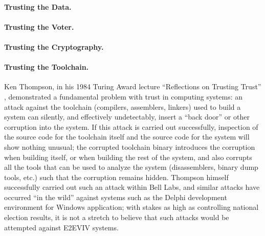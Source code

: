 \paragraph{Trusting the Data.} 

\paragraph{Trusting the Voter.} 

\paragraph{Trusting the Cryptography.} 

\paragraph{Trusting the Toolchain.} Ken Thompson, in his 1984 Turing
Award lecture ``Reflections on Trusting Trust'' \cite{Thompson84},
demonstrated a fundamental problem with trust in computing systems: an
attack against the toolchain (compilers, assemblers, linkers) used to
build a system can silently, and effectively undetectably, insert a
``back door'' or other corruption into the system. If this attack is
carried out successfully, inspection of the source code for the
toolchain itself and the source code for the system will show nothing
unusual; the corrupted toolchain binary introduces the corruption when
building itself, or when building the rest of the system, and also
corrupts all the tools that can be used to analyze the system
(disassemblers, binary dump tools, etc.) such that the corruption
remains hidden. Thompson himself successfully carried out such an
attack within Bell Labs, and similar attacks have occurred ``in the
wild'' against systems such as the Delphi development environment for
Windows application; with stakes as high as controlling national
election results, it is not a stretch to believe that such attacks
would be attempted against E2EVIV systems.

